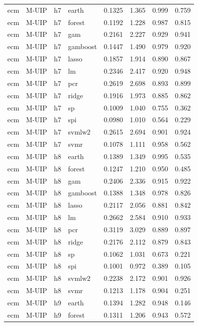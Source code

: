 \begin{ThreePartTable}
\begin{longtable}[t]{llclcccc}
\addlinespace
ecm & M-UIP & h7 & earth & 0.1325 & 1.365 & 0.999 & 0.759\\
ecm & M-UIP & h7 & forest & 0.1192 & 1.228 & 0.987 & 0.815\\
ecm & M-UIP & h7 & gam & 0.2161 & 2.227 & 0.929 & 0.941\\
ecm & M-UIP & h7 & gamboost & 0.1447 & 1.490 & 0.979 & 0.920\\
ecm & M-UIP & h7 & lasso & 0.1857 & 1.914 & 0.890 & 0.867\\
ecm & M-UIP & h7 & lm & 0.2346 & 2.417 & 0.920 & 0.948\\
ecm & M-UIP & h7 & pcr & 0.2619 & 2.698 & 0.893 & 0.899\\
ecm & M-UIP & h7 & ridge & 0.1916 & 1.973 & 0.885 & 0.862\\
ecm & M-UIP & h7 & sp & 0.1009 & 1.040 & 0.755 & 0.362\\
ecm & M-UIP & h7 & spi & 0.0980 & 1.010 & 0.564 & 0.229\\
ecm & M-UIP & h7 & svmlw2 & 0.2615 & 2.694 & 0.901 & 0.924\\
ecm & M-UIP & h7 & svmr & 0.1078 & 1.111 & 0.958 & 0.562\\
\addlinespace
ecm & M-UIP & h8 & earth & 0.1389 & 1.349 & 0.995 & 0.535\\
ecm & M-UIP & h8 & forest & 0.1247 & 1.210 & 0.950 & 0.485\\
ecm & M-UIP & h8 & gam & 0.2406 & 2.336 & 0.915 & 0.922\\
ecm & M-UIP & h8 & gamboost & 0.1388 & 1.348 & 0.978 & 0.826\\
ecm & M-UIP & h8 & lasso & 0.2117 & 2.056 & 0.881 & 0.842\\
ecm & M-UIP & h8 & lm & 0.2662 & 2.584 & 0.910 & 0.933\\
ecm & M-UIP & h8 & pcr & 0.3119 & 3.029 & 0.889 & 0.897\\
ecm & M-UIP & h8 & ridge & 0.2176 & 2.112 & 0.879 & 0.843\\
ecm & M-UIP & h8 & sp & 0.1062 & 1.031 & 0.673 & 0.221\\
ecm & M-UIP & h8 & spi & 0.1001 & 0.972 & 0.389 & 0.105\\
ecm & M-UIP & h8 & svmlw2 & 0.2238 & 2.172 & 0.901 & 0.926\\
ecm & M-UIP & h8 & svmr & 0.1213 & 1.178 & 0.904 & 0.251\\
\addlinespace
ecm & M-UIP & h9 & earth & 0.1394 & 1.282 & 0.948 & 0.146\\
ecm & M-UIP & h9 & forest & 0.1311 & 1.206 & 0.943 & 0.572\\

\end{longtable}
\end{ThreePartTable}
